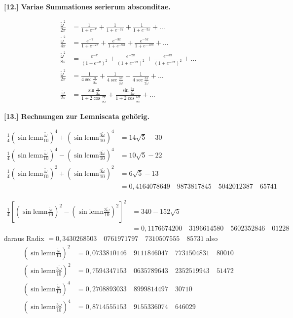 \documentclass[10pt,a4paper]{article}
\newcommand{\lemn}{\text{lemn}}
\newcommand{\sinlemn}{\sin\lemn}
\begin{document}
\medskip
\noindent\textbf{[12.] Variae Summationes serierum absconditae.}

\begin{align*}
\frac{\tilde{\omega}^2}{2\pi} &= \frac{1}{1+e^{-\pi}} + \frac{1}{1+e^{-3\pi}} + \frac{1}{1+e^{-5\pi}} + \ldots\\
\frac{\tilde{\omega}^2}{4\pi} &= \frac{e^{-\pi}}{1+e^{-2\pi}} + \frac{e^{-3\pi}}{1+e^{-6\pi}} + \frac{e^{-5\pi}}{1+e^{-10\pi}} + \ldots\\
\frac{\tilde{\omega}^2}{8\pi} &= \frac{e^{-\pi}}{(1+e^{-\pi})^2} + \frac{e^{-2\pi}}{(1+e^{-2\pi})^2} + \frac{e^{-3\pi}}{(1+e^{-3\pi})^2} + \ldots\\
\frac{\tilde{\omega}^2}{2\pi} &= \frac{1}{4\sec\tfrac{\pi}{2\tilde{\omega}}} + \frac{1}{4\sec\tfrac{3\pi}{2\tilde{\omega}}} + \frac{1}{4\sec\tfrac{5\pi}{2\tilde{\omega}}} + \ldots\\
\frac{\tilde{\omega}}{2\pi} &= \frac{\sin\tfrac{\pi}{2\tilde{\omega}}}{1+2\cos\tfrac{2\pi}{2\tilde{\omega}}} + \frac{\sin\tfrac{3\pi}{2\tilde{\omega}}}{1+2\cos\tfrac{6\pi}{2\tilde{\omega}}} + \ldots
\end{align*}

\medskip
\noindent\textbf{[13.] Rechnungen zur Lemniscata gehörig.}

\begin{align*}
\tfrac14(\sinlemn\tfrac{\tilde{\omega}}{10})^4 + (\sinlemn\tfrac{3\tilde{\omega}}{10})^4 &= 14\sqrt{5} - 30\\
\tfrac14(\sinlemn\tfrac{\tilde{\omega}}{10})^4 - (\sinlemn\tfrac{3\tilde{\omega}}{10})^4 &= 10\sqrt{5} - 22\\
\tfrac14(\sinlemn\tfrac{\tilde{\omega}}{10})^2 + (\sinlemn\tfrac{3\tilde{\omega}}{10})^2 &= 6\sqrt{5} - 13\\
&= 0{,}4164078649\quad 9873817845\quad 5042012387\quad 65741
\end{align*}

\begin{align*}
\tfrac14[(\sinlemn\tfrac{\tilde{\omega}}{10})^2 - (\sinlemn\tfrac{3\tilde{\omega}}{10})^2]^2 &= 340 - 152\sqrt{5}\\
&= 0{,}1176674200\quad 3196614580\quad 5602352846\quad 01228
\end{align*}
daraus Radix $= 0{,}3430268503\quad 0761971797\quad 7310507555\quad 85731$
also
\begin{align*}
(\sinlemn\tfrac{\tilde{\omega}}{10})^2 &= 0{,}0733810146\quad 9111846047\quad 7731504831\quad 80010\\
(\sinlemn\tfrac{3\tilde{\omega}}{10})^2 &= 0{,}7594347153\quad 0635789643\quad 2352519943\quad 51472\\
(\sinlemn\tfrac{\tilde{\omega}}{10})^4 &= 0{,}2708893033\quad 8999814497\quad 30710\\
(\sinlemn\tfrac{3\tilde{\omega}}{10})^4 &= 0{,}8714555153\quad 9155336074\quad 646029
\end{align*}
\end{document}
